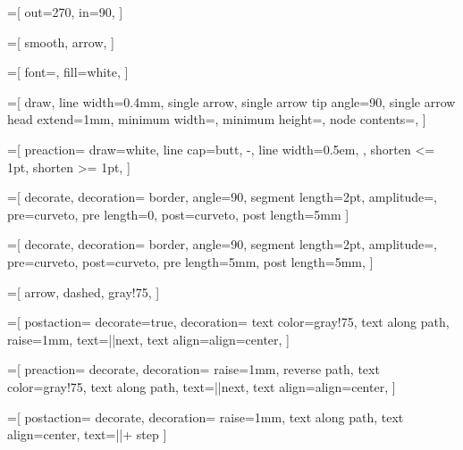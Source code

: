 =[
  out=270,
  in=90,
]

=[
  smooth,
  arrow,
]

=[
  font=\footnotesize,
  fill=white,
]



\newlength{\bigarrowwidth}
\setlength{\bigarrowwidth}{5mm}
=[
  draw,
  line width=0.4mm,
  single arrow,
  single arrow tip angle=90,
  single arrow head extend=1mm,
  minimum width=\bigarrowwidth,
  minimum height=\bigarrowwidth,
  node contents={},
]

=[
  preaction={
    draw=white,
    line cap=butt,
    -,
    line width=0.5em,
  },
  shorten <= 1pt,
  shorten >= 1pt,
]

=[
  decorate,
  decoration={
    border,
    angle=90,
    segment length=2pt,
    amplitude=\pgflinewidth,
    pre=curveto,
    pre length=0,
    post=curveto,
    post length=5mm
  }
]

=[
  decorate,
  decoration={
    border,
    angle=90,
    segment length=2pt,
    amplitude=\pgflinewidth,
    pre=curveto,
    post=curveto,
    pre length=5mm,
    post length=5mm,
  }
]

=[
  arrow,
  dashed,
  gray!75,
]

=[
  postaction={
    decorate=true,
    decoration={
      text color=gray!75,
      text along path,
      raise=1mm,
      text={|\ttfamily\scriptsize|next},
      text align={align=center},
    }
  }
]

=[
  preaction={
    decorate,
    decoration={
      raise=1mm,
      reverse path,
      text color=gray!75,
      text along path,
      text={|\ttfamily\scriptsize|next},
      text align={align=center},
    }
  }
]

=[
  postaction={
    decorate,
    decoration={
      raise=1mm,
      text along path,
      text align=center,
      text={|\ttfamily \scriptsize|+ step}
    }
  }
]

